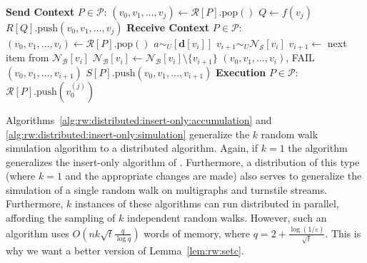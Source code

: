 \documentclass{report}
\newcommand{\push}[1]{\text{push} \left ( #1 \right )}
\newcommand{\pop}{\text{pop}()}
\begin{document}
\begin{algorithm}[htbp]
\begin{flushleft}
\begin{algorithmic}[1]
	\Statex \textbf{Send Context} $P \in \mathcal{P}$:
  			\State $(v_0, v_1, \dots, v_j) \gets \mathcal{R}[P].\pop$
			\State $Q \gets f(v_j)$
			\State $R[Q].\push{v_0, v_1, \dots, v_{j}}$
  		\EndWhile
	\Statex \textbf{Receive Context} $P \in \mathcal{P}$:
  			\State $(v_0, v_1, \dots, v_i) \gets \mathcal{R}[P].\pop$
			\State $a \sim_U [\mathbf{d}[{v_i}]] $
				\State $v_{i+1} \sim_U \mathcal{N}_\mathcal{S}[v_i]$
			\Else
					\State $v_{i+1} \gets$ next item from $\mathcal{N}_\mathcal{B}[v_i]$
					\State $\mathcal{N}_\mathcal{B}[v_i] \gets \mathcal{N}_\mathcal{B}[v_i] \setminus \{v_{i+1}\}$
				\Else
					\State \Return $(v_0, v_1, \dots, v_i)$, FAIL
				\EndIf
			\EndIf
				\State \Return $(v_0, v_1, \dots, v_{i+1})$
			\Else
				\State $S[P].\push{v_0, v_1, \dots, v_{i+1}}$
			\EndIf
  		\EndWhile
	\Statex \textbf{Execution} $P \in \mathcal{P}$:
				\State $\mathcal{R}[P].\push{v_0^{(j)}}$
			\EndIf
		\EndParFor
\end{algorithmic}
\end{flushleft}
\end{algorithm}


Algorithms~\ref{alg:rw:distributed:insert-only:accumulation} and \ref{alg:rw:distributed:insert-only:simulation} generalize the $k$ random walk simulation algorithm to a distributed algorithm. 
Again, if $k=1$ the algorithm generalizes the insert-only algorithm of \cite{jin2018simulating}.
Furthermore, a distribution of this type (where $k=1$ and the appropriate changes are made) also serves to generalize the simulation of a single random walk on multigraphs and turnstile streams.
Furthermore, $k$ instances of these algorithms can run distributed in parallel, affording the sampling of $k$ independent random walks. 
However, such an algorithm uses $O \left (nk\sqrt{t} \frac{q}{\log q} \right )$ words of memory, where $q = 2 + \frac{\log(1/\varepsilon)}{\sqrt{t}}$.
This is why we want a better version of Lemma~\ref{lem:rw:setc}.
\end{document}

